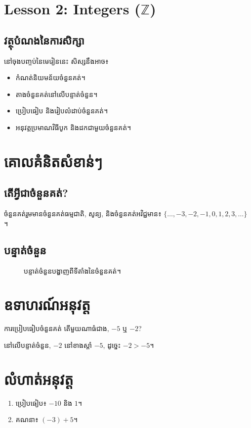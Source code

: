 \clearpage
\setcounter{section}{0}

\section*{Lesson 2: Integers ($\mathbb{Z}$)}


\subsection*{វត្ថុបំណងនៃការសិក្សា}
    នៅចុងបញ្ចប់នៃមេរៀននេះ សិស្សនឹងអាច៖
    \begin{itemize}[label=---]
        \item កំណត់និយមន័យចំនួនគត់។
        \item តាងចំនួនគត់នៅលើបន្ទាត់ចំនួន។
        \item ប្រៀបធៀប និងរៀបលំដាប់ចំនួនគត់។
        \item អនុវត្តប្រមាណវិធីបូក និងដកជាមួយចំនួនគត់។
    \end{itemize}

\section{គោលគំនិតសំខាន់ៗ}
\subsection{តើអ្វីជាចំនួនគត់?}
ចំនួនគត់រួមមានចំនួនគត់ធម្មជាតិ, សូន្យ, និងចំនួនគត់អវិជ្ជមាន៖ $\{\dots, -3, -2, -1, 0, 1, 2, 3, \dots\}$ ។

\subsection{បន្ទាត់ចំនួន}
\begin{figure}[h!]
    \centering
    \caption{បន្ទាត់ចំនួនបង្ហាញពីទីតាំងនៃចំនួនគត់។}
    \label{fig:integer-number-line}
\end{figure}

\section{ឧទាហរណ៍អនុវត្ត}

\begin{example}{ការប្រៀបធៀបចំនួនគត់}
តើមួយណាធំជាង, $-5$ ឬ $-2$?
\begin{solution}
នៅលើបន្ទាត់ចំនួន, $-2$ នៅខាងស្តាំ $-5$, ដូច្នេះ $-2 > -5$។
\end{solution}
\end{example}

\section{លំហាត់អនុវត្ត}
\begin{enumerate}[label=\arabic*.]
    \item ប្រៀបធៀប៖ $-10$ និង $1$។
    \item គណនា៖ $(-3) + 5$។
\end{enumerate}

